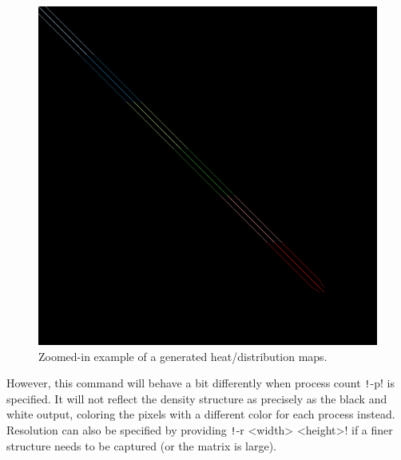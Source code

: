 \documentclass[thesis=M,english]{FITthesis}[2019/12/23]
\newcommand{\csre}[1]{\texttt!#1!}
\begin{document}
\begin{figure}[htp]
\begin{minipage}{0.5\textwidth}
        \includegraphics[trim=0 2500 2500 0, clip, scale=0.1]{static/e40r5000.dist.png}
    \end{minipage}
    \caption{Zoomed-in example of a generated heat/distribution maps.}
\end{figure}

However, this command will behave a bit differently when process count \csre{-p} is specified. It will not
reflect the density structure as precisely as the black and white output, coloring the pixels
with a different color for each process instead. Resolution can also be specified by providing 
\csre{-r <width> <height>} if a finer structure needs to be captured (or the matrix is large).
\end{document}
